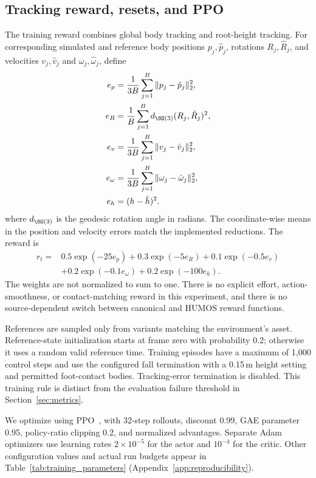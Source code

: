 \subsection{Tracking reward, resets, and PPO}\label{sec:learning}

The training reward combines global body tracking and root-height tracking.
For corresponding simulated and reference body positions $p_j,\hat{p}_j$,
rotations $R_j,\hat{R}_j$, and velocities $v_j,\hat{v}_j$ and
$\omega_j,\hat{\omega}_j$, define
\begin{align}
    e_p &= \frac{1}{3B}\sum_{j=1}^{B}\|p_j-\hat{p}_j\|_2^2,
    \\
    e_R &= \frac{1}{B}\sum_{j=1}^{B}
                  d_{\SO(3)}(R_j,\hat{R}_j)^2, \\
    e_v &= \frac{1}{3B}\sum_{j=1}^{B}\|v_j-\hat{v}_j\|_2^2,
    \\
    e_\omega &= \frac{1}{3B}\sum_{j=1}^{B}
                     \|\omega_j-\hat{\omega}_j\|_2^2, \\
    e_h &= (h-\hat{h})^2.
\end{align}
where $d_{\SO(3)}$ is the geodesic rotation angle in radians.
The coordinate-wise means in the position and velocity errors match the
implemented reductions. The reward is
\begin{equation}
\begin{split}
    r_t ={}& 0.5\exp(-25e_p) + 0.3\exp(-5e_R)
             + 0.1\exp(-0.5e_v)\\
           &+0.2\exp(-0.1e_\omega) + 0.2\exp(-100e_h).
\end{split}\label{eq:reward}
\end{equation}
The weights are not normalized to sum to one. There is no explicit effort,
action-smoothness, or contact-matching reward in this experiment, and there
is no source-dependent switch between canonical and HUMOS reward functions.

References are sampled only from variants matching the environment's asset.
Reference-state initialization starts at frame zero with probability 0.2;
otherwise it uses a random valid reference time. Training episodes have a
maximum of 1,000 control steps and use the configured fall termination with
a 0.15\,m height setting and permitted foot-contact bodies. Tracking-error
termination is disabled. This training rule is distinct from the evaluation
failure threshold in Section~\ref{sec:metrics}.

We optimize using PPO~\cite{ppo}, with 32-step rollouts, discount 0.99,
GAE parameter 0.95, policy-ratio clipping 0.2, and normalized advantages.
Separate Adam optimizers use learning rates $2\times10^{-5}$ for the actor
and $10^{-4}$ for the critic. Other configuration values and actual run
budgets appear in Table~\ref{tab:training_parameters}
(Appendix~\ref{app:reproducibility}).

